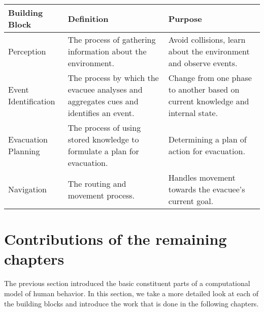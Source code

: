 \begin{table}[tbp]
\centering
{} %
\begin{tabular}{p{1.0in}   p{2.1in}   p{2.4in}} %
\hline\hline %
Building Block & Definition & Purpose \\
\hline
Perception  & The process of gathering information about the environment. & Avoid collisions, learn about the environment and observe events.\\[3pt]
Event Identification & The process by which the evacuee analyses and aggregates cues and identifies an event.  & Change from one phase to another based on current knowledge and internal state.\\[3pt]
Evacuation Planning & The process of using stored knowledge to formulate a plan for evacuation. & Determining a plan of action for evacuation. \\[3pt]
Navigation & The routing and movement process. & Handles movement towards the evacuee's current goal. \\[3pt]
\bottomrule
\end{tabular}
\label{tab:BuildingBlocks}
\end{table}

\section{Contributions of the remaining chapters}
\label{IBEVAC:AgentArchitecture}


The previous section introduced the basic constituent parts of a computational model of human behavior. In this section, we take a more detailed look at each of the building blocks and introduce the work that is done in the following chapters.


